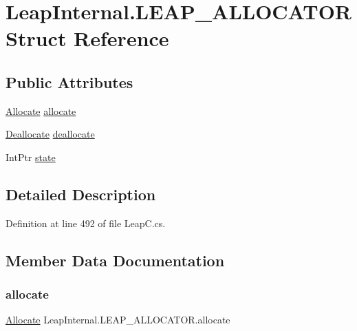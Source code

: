 \hypertarget{struct_leap_internal_1_1_l_e_a_p___a_l_l_o_c_a_t_o_r}{}\section{Leap\+Internal.\+L\+E\+A\+P\+\_\+\+A\+L\+L\+O\+C\+A\+T\+OR Struct Reference}
\label{struct_leap_internal_1_1_l_e_a_p___a_l_l_o_c_a_t_o_r}
\subsection*{Public Attributes}
\begin{DoxyCompactItemize}
\item 
\mbox{\hyperlink{namespace_leap_internal_abdbcd89d8bb63e029a380256e3679660}{Allocate}} \mbox{\hyperlink{struct_leap_internal_1_1_l_e_a_p___a_l_l_o_c_a_t_o_r_ac889b4bddcc8bf8bb6d305a576340a7f}{allocate}}
\item 
\mbox{\hyperlink{namespace_leap_internal_a5a737b35c25482e1d39e14a9d766553a}{Deallocate}} \mbox{\hyperlink{struct_leap_internal_1_1_l_e_a_p___a_l_l_o_c_a_t_o_r_a8f4412b62bf9cb6548aa0110838e62f2}{deallocate}}
\item 
Int\+Ptr \mbox{\hyperlink{struct_leap_internal_1_1_l_e_a_p___a_l_l_o_c_a_t_o_r_a19bd54e9bca5966f40c0677a69b30329}{state}}
\end{DoxyCompactItemize}


\subsection{Detailed Description}


Definition at line 492 of file Leap\+C.\+cs.



\subsection{Member Data Documentation}
\mbox{\label{struct_leap_internal_1_1_l_e_a_p___a_l_l_o_c_a_t_o_r_ac889b4bddcc8bf8bb6d305a576340a7f}} 
\subsubsection{\texorpdfstring{allocate}{allocate}}
{\footnotesize\ttfamily \mbox{\hyperlink{namespace_leap_internal_abdbcd89d8bb63e029a380256e3679660}{Allocate}} Leap\+Internal.\+L\+E\+A\+P\+\_\+\+A\+L\+L\+O\+C\+A\+T\+O\+R.\+allocate}



